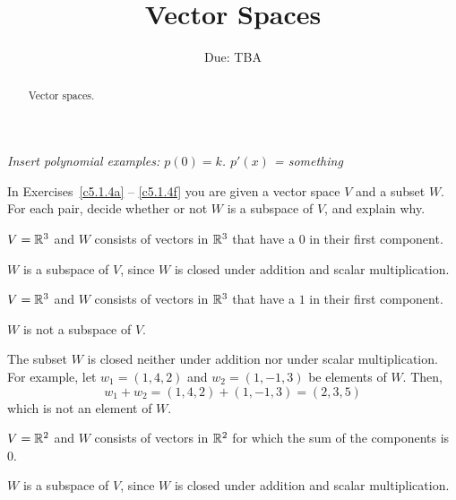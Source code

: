 \documentclass{ximera}
\title{Vector Spaces}
\author{\phantom{Dr. Golubitsky}}
\date{Due: TBA}
\begin{document}
\begin{abstract}
Vector spaces.   
\end{abstract}
\maketitle




\emph{Insert polynomial examples: $p(0) = k$.  $p'(x)$ = something}


\problemlabel

\noindent In Exercises~\ref{c5.1.4a} -- \ref{c5.1.4f} you are given a
vector space $V$ and a subset $W$.  For each pair, decide whether or
not $W$ is a subspace of $V$, and explain why.


\begin{exercise} \label{c5.1.4a}
$V={\mathbb R}^3$ and $W$ consists of vectors in ${\mathbb R}^3$
     that have a $0$ in their first component.

\begin{solution}
$W$ is a subspace of $V$, since $W$ is closed under
addition and scalar multiplication.

\end{solution}
\end{exercise}




\problemlabel

\begin{exercise} \label{c5.1.4b}
$V={\mathbb R}^3$ and $W$ consists of vectors in ${\mathbb R}^3$
     that have a $1$ in their first component.

\begin{solution}
\ans $W$ is not a subspace of $V$.

\soln The subset $W$ is closed neither under addition nor under scalar
multiplication.  For example, let $w_1 = (1,4,2)$ and $w_2 = (1,-1,3)$
be elements of $W$.  Then,
\[
w_1 + w_2 = (1,4,2) + (1,-1,3) = (2,3,5)
\]
which is not an element of $W$.


\end{solution}
\end{exercise}




\problemlabel

\begin{exercise} \label{c5.1.4c}
$V={\mathbb R}^2$ and $W$ consists of vectors in ${\mathbb R}^2$
     for which the sum of the components is $0$.

\begin{solution}
$W$ is a subspace of $V$, since $W$ is closed under
addition and scalar multiplication.

\end{solution}
\end{exercise}
\end{document}
